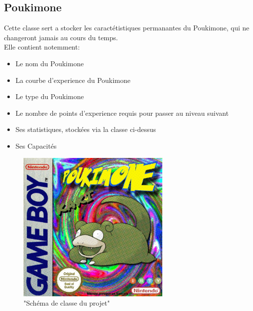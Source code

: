 \documentclass{report}
\begin{document}
\subsection*{Poukimone}
Cette classe sert a stocker les caractétistiques permanantes du Poukimone, qui ne changeront jamais au cours du temps.\\ 
Elle contient notemment:
\begin{itemize}
    \item{Le nom du Poukimone}\\
    \item{La courbe d'experience du Poukimone}\\
    \item{Le type du Poukimone}\\
    \item{Le nombre de points d'experience requis pour passer au niveau suivant}\\
    \item{Ses statistiques, stockées via la classe ci-dessus}\\
    \item{Ses Capacités}
\end{itemize}


\begin{figure}[ht!]
    \centering
    \includegraphics[width=75mm]{cover.jpg}
    \caption{"Schéma de classe du projet"}
\end{figure}
\end{document}
